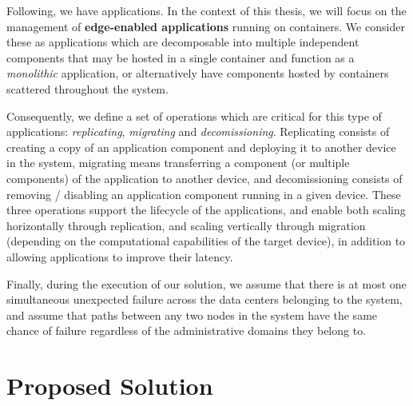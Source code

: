 Following, we have applications. In the context of this thesis, we will focus on the management of \textbf{edge-enabled applications} running on containers. We consider these as applications which are decomposable into multiple independent components that may be hosted in a single container and function as a \textit{monolithic} application, or alternatively have components hosted by containers scattered throughout the system.

Consequently, we define a set of operations which are critical for this type of applications: \textit{replicating}, \textit{migrating} and \textit{decomissioning}. Replicating consists of creating a copy of an application component and deploying it to another device in the system, migrating means transferring a component (or multiple components) of the application to another device, and decomissioning consists of removing / disabling an application component running in a given device. These three operations support the lifecycle of the applications, and enable both scaling horizontally through replication, and scaling vertically through migration (depending on the computational capabilities of the target device), in addition to allowing applications to improve their latency. 

Finally, during the execution of our solution, we assume that there is at most one simultaneous unexpected failure across the data centers belonging to the system, and assume that paths between any two nodes in the system have the same chance of failure regardless of the administrative domains they belong to.

\section{Proposed Solution}
\label{cha:proposed_sol}


